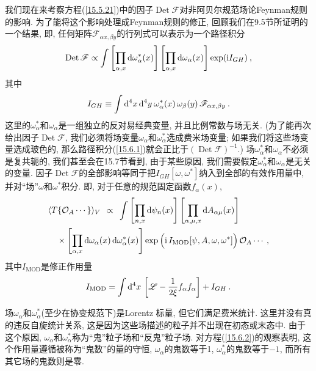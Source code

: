 我们现在来考察方程(\ref{15.5.21})中的因子$\operatorname{Det}\mathscr{F}$对非阿贝尔规范场论Feynman规则的影响. 为了能将这个影响处理成Feynman规则的修正, 回顾我们在9.5节所证明的一个结果, 即,
任何矩阵$\mathscr{F}_{\alpha x,\beta y}$的行列式可以表示为一个路径积分
\begin{equation}
\operatorname{Det} \mathscr{F}\propto \int \left[ \prod_{\alpha ,x}\mathrm{d}\omega _{\alpha
}^{\ast }(x)\right] \left[ \prod_{\alpha ,x}\mathrm{d}\omega _{\alpha }(x)\right]
\exp (\mathrm{i} I_{GH})\:,   \label{15.6.1}
\end{equation}%
其中\begin{equation}
I_{GH}\equiv \int \dif^{4}x\,\dif^{4}y\:\omega _{\alpha }^{\ast }(x)\,\omega _{\beta }(y)\,%
\mathscr{F}_{\alpha x,\beta y}\:.   \label{15.6.2}
\end{equation}%
这里的$\omega _{\alpha }^{\ast }$和$\omega _{\alpha}$是一组独立的反对易经典变量, 
并且比例常数与场无关. (为了能再次给出因子$\operatorname{Det} \mathscr{F}$, 
我们必须将场变量$\omega _{\alpha }$和$\omega _{\alpha }^{\ast }$选成费米场变量; 如果我们将这些场变量选成玻色的, 那么路径积分(\ref{15.6.1})就会正比于$(\operatorname{Det} \mathscr{F})^{-1}$.) 场$\omega _{\alpha }^{\ast}$和$\omega _{\alpha }$不必须是复共轭的, 我们甚至会在15.7节看到, 由于某些原因, 我们需要假定$\omega _{\alpha }^{\ast }$和$\omega _{\alpha }$是无关的{}变量. 因子$\operatorname{Det} \mathscr{F}$的全部影响等同于把$I_{GH}[\omega,\omega^{\ast}]$纳入到全部的有效作用量中, 并对``场''$\omega $和$\omega ^{\ast }$积分. 即, 对于任意的规范固定函数$f_{\alpha }(x)$,%
\begin{align}
&\langle T\{\mathcal{O}_{A}\cdots \}\rangle _{V} \:\:\propto\:\: \int \left[
\prod_{n,x}\mathrm{d}\psi _{n}(x)\right] \left[ \prod_{\alpha ,\mu ,x}\mathrm{d} A_{\alpha \mu
}(x)\right]   \nonumber \\
&\quad\times \left[ \prod_{\alpha ,x}\mathrm{d}\omega _{\alpha }(x)\,\mathrm{d}\omega _{\alpha
}^{\ast }(x)\right] \exp \Big( \mathrm{i}\,I_{\mathrm{MOD}}[\psi ,A,\omega ,\omega
^{\ast }]\Big) \,\mathcal{O}_{A}\cdots \:,   \label{15.6.3}
\end{align}%
其中$I_{\mathrm{MOD}}$是修正作用量
\begin{equation}
I_{\text{MOD}}=\int \mathrm{d}^{4}x\,\left[ \mathscr{L}-\frac{1}{2\xi }f_{\alpha
}f_{\alpha }\right] +I_{GH}\:.   \label{15.6.4}
\end{equation}

场$\omega _{\alpha }$和$\omega _{\alpha }^{\ast }$(至少在协变规范下)是Lorentz%
标量, 但它们满足费米统计. 这里并没有真的违反自旋统计关系, 这是因为这些场描述的粒子并不出现在初态或末态中. 
由于这个原因, $\omega _{\alpha }$和$\omega _{\alpha }^{\ast }$称为``鬼''粒子场和``反鬼''粒子场. 
对方程(\ref{15.6.2})的观察表明, 这个作用量遵循被称为``鬼数''的量的守恒, 
$\omega _{\alpha }$的鬼数等于1, $\omega _{\alpha }^{\ast }$的鬼数等于$-1$, 
而所有其它场的鬼数则是零.%

